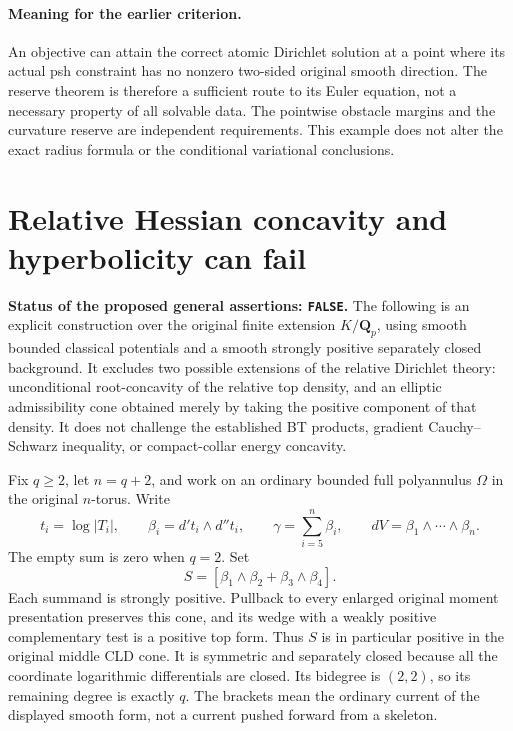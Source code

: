 \documentclass[11pt,a4paper]{article}
\numberwithin{equation}{section}
\theoremstyle{definition}
\theoremstyle{remark}
\begin{document}
\paragraph{Meaning for the earlier criterion.}
An objective can attain the correct atomic Dirichlet solution at a
point where its actual psh constraint has no nonzero two-sided
original smooth direction. The reserve theorem is therefore a
sufficient route to its Euler equation, not a necessary property of
all solvable data. The pointwise obstacle margins and the curvature
reserve are independent requirements. This example does not alter
the exact radius formula or the conditional variational conclusions.



\section{Relative Hessian concavity and hyperbolicity can fail}
\label{sec:r6-relative-hessian-obstruction}

\noindent\textbf{Status of the proposed general assertions:
\texttt{FALSE}.} The following is an explicit construction over the
original finite extension $K/\mathbf Q_p$, using smooth bounded classical
potentials and a smooth strongly positive separately closed background.
It excludes two possible extensions of the relative Dirichlet theory:
unconditional root-concavity of the relative top density, and an
elliptic admissibility cone obtained merely by taking the positive
component of that density. It does not challenge the established BT
products, gradient Cauchy--Schwarz inequality, or compact-collar energy
concavity.

Fix $q\ge2$, let $n=q+2$, and work on an ordinary bounded full
polyannulus $\Omega$ in the original $n$-torus. Write
\[
 t_i=\log|T_i|,\qquad
 \beta_i=d't_i\wedge d''t_i,\qquad
 \gamma=\sum_{i=5}^{n}\beta_i,\qquad
 dV=\beta_1\wedge\cdots\wedge\beta_n.
\]
The empty sum is zero when $q=2$. Set
\[
                S=[\beta_1\wedge\beta_2+\beta_3\wedge\beta_4].
\]
Each summand is strongly positive. Pullback to every enlarged original
moment presentation preserves this cone, and its wedge with a weakly
positive complementary test is a positive top form. Thus $S$ is in
particular positive in the original middle CLD cone. It is symmetric
and separately closed because all the coordinate logarithmic
differentials are closed. Its bidegree is $(2,2)$, so its remaining
degree is exactly $q$. The brackets mean the ordinary current of the
displayed smooth form, not a current pushed forward from a skeleton.
\end{document}

